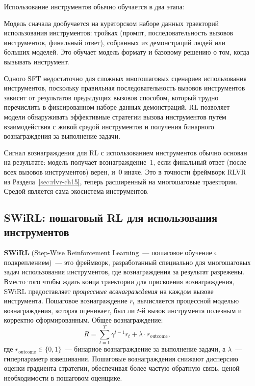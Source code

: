 Использование инструментов обычно обучается в два этапа:

\begin{description}[leftmargin=!,labelwidth=3.5cm]
\item[SFT на демонстрациях] Модель сначала дообучается на
  кураторском наборе данных траекторий использования инструментов: тройках (промпт, последовательность
  вызовов инструментов, финальный ответ), собранных из демонстраций людей
  или больших моделей. Это обучает модель формату и
  базовому решению о том, когда вызывать инструмент.

\item[RL для многошагового использования инструментов] Одного SFT недостаточно для
  сложных многошаговых сценариев использования инструментов, поскольку правильная последовательность
  вызовов инструментов зависит от результатов предыдущих вызовов способом, который
  трудно перечислить в фиксированном наборе данных демонстраций. RL позволяет
  модели обнаруживать эффективные стратегии вызова инструментов путём
  взаимодействия с живой средой инструментов и получения бинарного
  вознаграждения за выполнение задачи.
\end{description}

Сигнал вознаграждения для RL с использованием инструментов обычно основан на результате: модель
получает вознаграждение~$1$, если финальный ответ (после всех вызовов инструментов)
верен, и~$0$ иначе. Это в точности фреймворк RLVR
из Раздела~\ref{sec:rlvr-ch15}, теперь расширенный на многошаговые траектории.
Средой является сама экосистема инструментов.

\subsection{SWiRL: пошаговый RL для использования инструментов}
\label{subsec:swirl}

\textbf{SWiRL} (Step-Wise Reinforcement Learning~--- пошаговое обучение с подкреплением)~--- это фреймворк,
разработанный специально для многошаговых задач использования инструментов, где вознаграждения за результат
разрежены. Вместо того чтобы ждать конца траектории для присвоения вознаграждения,
SWiRL предоставляет \emph{процессные вознаграждения} на каждом вызове инструмента.
Пошаговое вознаграждение $r_t$ вычисляется процессной моделью вознаграждения, которая
оценивает, был ли $t$-й вызов инструмента полезным и корректно сформированным.
Общее вознаграждение:
\begin{equation}
\label{eq:swirl-reward}
R = \sum_{t=1}^{T} \gamma^{t-1} r_t + \lambda \cdot r_{\mathrm{outcome}},
\end{equation}
где $r_{\mathrm{outcome}} \in \{0, 1\}$~--- бинарное вознаграждение за выполнение задачи,
а $\lambda$~--- гиперпараметр взвешивания. Пошаговые вознаграждения
снижают дисперсию оценки градиента стратегии, обеспечивая более
частую обратную связь, ценой необходимости в пошаговом оценщике.

